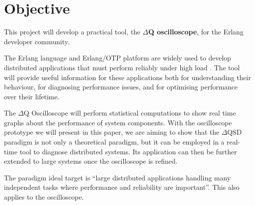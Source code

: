 \section{Objective}
         This project will develop a practical tool, the \textbf{$\Delta$Q oscilloscope}, for the Erlang developer community. 
    
    The Erlang language and Erlang/OTP platform are widely used to develop distributed applications that must perform reliably under high load \cite{erl}. The tool will provide useful information for these applications both for understanding their behaviour, for diagnosing performance issues, and for optimising performance over their lifetime. \cite{post}

    The $\Delta$Q Oscilloscope will perform statistical computations to show real time graphs about the performance of system components. With the oscilloscope prototype we will present in this paper, we are aiming to show that the $\Delta$QSD paradigm is not only a theoretical paradigm, but it can be employed in a real-time tool to diagnose distributed systems. Its application can then be further extended to large systems once the oscilloscope is refined.  
 
    The paradigm ideal target is ``large distributed applications handling many independent tasks where performance and reliability are important''. \cite{dq-tut} This also applies to the oscilloscope.
    

